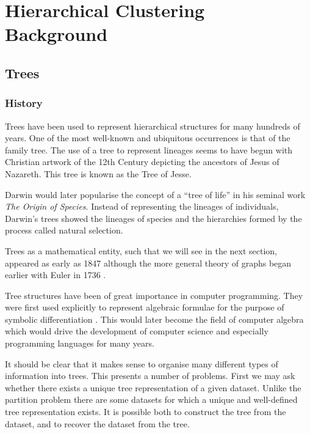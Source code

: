 \chapter{Hierarchical Clustering Background}
\label{cha:background2}



\section{Trees}
\label{sec:trees}

\subsection{History}
\label{sec:history}

Trees have been used to represent hierarchical structures for many hundreds of
years.  One of the most well-known and ubiquitous occurrences is that of the
family tree.  The use of a tree to represent lineages seems to have begun with
Christian artwork of the 12th Century depicting the ancestors of Jesus of
Nazareth.  This tree is known as the Tree of Jesse.

Darwin would later popularise the concept of a ``tree of life'' in his seminal
work \textit{The Origin of Species}.  Instead of representing the lineages of
individuals, Darwin's trees showed the lineages of species and the hierarchies
formed by the process called natural selection.

Trees as a mathematical entity, such that we will see in the next section,
appeared as early as 1847 \citep{knuth97taocp1} although the more general
theory of graphs began earlier with Euler in 1736 \citep{bigg1976graph}.

Tree structures have been of great importance in computer programming.  They
were first used explicitly to represent algebraic formulae for the purpose of
symbolic differentiation \citep{kahrimanian53differentiation}.  This would
later become the field of computer algebra which would drive the development
of computer science and especially programming languages for many years.

It should be clear that it makes sense to organise many different types of
information into trees.  This presents a number of problems.  First we may ask
whether there exists a unique tree representation of a given dataset.  Unlike
the partition problem there are some datasets for which a unique and
well-defined tree representation exists.  It is possible both to construct the
tree from the dataset, and to recover the dataset from the tree.


